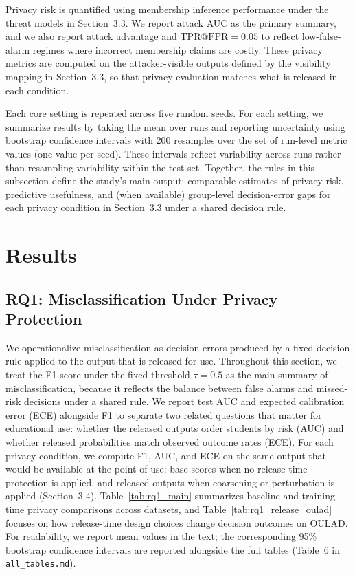 \documentclass{edm_article}
\begin{document}
Privacy risk is quantified using membership inference performance under the threat models in Section~3.3. We report attack AUC as the primary summary, and we also report attack advantage and $\mathrm{TPR}@\mathrm{FPR}=0.05$ to reflect low-false-alarm regimes where incorrect membership claims are costly. These privacy metrics are computed on the attacker-visible outputs defined by the visibility mapping in Section~3.3, so that privacy evaluation matches what is released in each condition.

Each core setting is repeated across five random seeds. For each setting, we summarize results by taking the mean over runs and reporting uncertainty using bootstrap confidence intervals with 200 resamples over the set of run-level metric values (one value per seed). These intervals reflect variability across runs rather than resampling variability within the test set. Together, the rules in this subsection define the study's main output: comparable estimates of privacy risk, predictive usefulness, and (when available) group-level decision-error gaps for each privacy condition in Section~3.3 under a shared decision rule.

\section{Results}

\subsection{RQ1: Misclassification Under Privacy Protection}
\label{subsec:rq1}

We operationalize misclassification as decision errors produced by a fixed decision rule applied to the output that is released for use. Throughout this section, we treat the F1 score under the fixed threshold $\tau=0.5$ as the main summary of misclassification, because it reflects the balance between false alarms and missed-risk decisions under a shared rule. We report test AUC and expected calibration error (ECE) alongside F1 to separate two related questions that matter for educational use: whether the released outputs order students by risk (AUC) and whether released probabilities match observed outcome rates (ECE). For each privacy condition, we compute F1, AUC, and ECE on the same output that would be available at the point of use: base scores when no release-time protection is applied, and released outputs when coarsening or perturbation is applied (Section~3.4). Table~\ref{tab:rq1_main} summarizes baseline and training-time privacy comparisons across datasets, and Table~\ref{tab:rq1_release_oulad} focuses on how release-time design choices change decision outcomes on OULAD. For readability, we report mean values in the text; the corresponding 95\% bootstrap confidence intervals are reported alongside the full tables (Table~6 in \texttt{all\_tables.md}).
\end{document}
